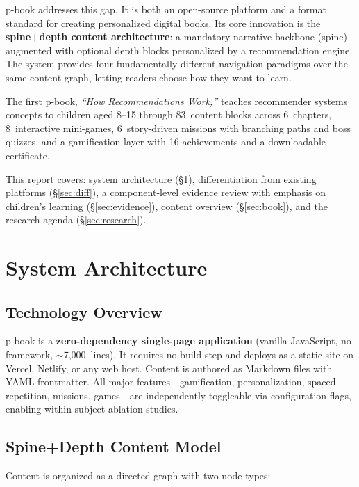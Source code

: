 \documentclass[11pt,a4paper]{article}
\begin{document}
p-book addresses this gap. It is both an open-source platform and a format standard for creating personalized digital books. Its core innovation is the \textbf{spine+depth content architecture}: a mandatory narrative backbone (spine) augmented with optional depth blocks personalized by a recommendation engine. The system provides four fundamentally different navigation paradigms over the same content graph, letting readers choose how they want to learn.

The first p-book, \emph{``How Recommendations Work,''} teaches recommender systems concepts to children aged 8--15 through 83~content blocks across 6~chapters, 8~interactive mini-games, 6~story-driven missions with branching paths and boss quizzes, and a gamification layer with 16 achievements and a downloadable certificate.

This report covers: system architecture (\S\ref{sec:arch}), differentiation from existing platforms (\S\ref{sec:diff}), a component-level evidence review with emphasis on children's learning (\S\ref{sec:evidence}), content overview (\S\ref{sec:book}), and the research agenda (\S\ref{sec:research}).

\section{System Architecture}\label{sec:arch}

\subsection{Technology Overview}

p-book is a \textbf{zero-dependency single-page application} (vanilla JavaScript, no framework, $\sim$7,000~lines). It requires no build step and deploys as a static site on Vercel, Netlify, or any web host. Content is authored as Markdown files with YAML frontmatter. All major features---gamification, personalization, spaced repetition, missions, games---are independently toggleable via configuration flags, enabling within-subject ablation studies.

\subsection{Spine+Depth Content Model}

Content is organized as a directed graph with two node types:
\end{document}
